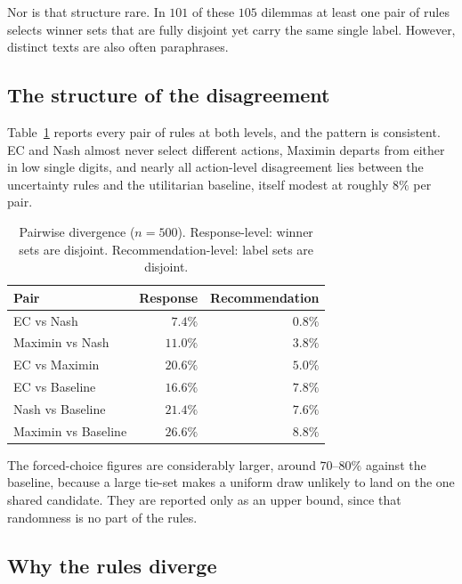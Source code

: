 \documentclass[10pt,twocolumn,a4paper]{article}
\begin{document}
Nor is that structure rare. In $101$ of these $105$ dilemmas at least
one pair of rules selects winner sets that are fully disjoint yet carry
the same single label. However, distinct texts are also often paraphrases.

\subsection{The structure of the disagreement}
\label{sec:results-pairwise}



Table~\ref{tab:pairwise} reports every pair of rules at both levels,
and the pattern is consistent. EC and Nash almost never select
different actions, Maximin departs from either in low single digits,
and nearly all action-level disagreement lies between the uncertainty
rules and the utilitarian baseline, itself modest at roughly $8\%$ per
pair.

\begin{table}[htbp]
\centering
\small
\caption{Pairwise divergence ($n = 500$). Response-level: winner sets
are disjoint. Recommendation-level: label sets are disjoint.}
\label{tab:pairwise}
\vspace{2pt}
\begin{tabular}{@{}l r r@{}}
\toprule
\textbf{Pair} & \textbf{Response} & \textbf{Recommendation} \\
\midrule
EC vs Nash            & $7.4\%$  & $0.8\%$ \\
Maximin vs Nash       & $11.0\%$ & $3.8\%$ \\
EC vs Maximin         & $20.6\%$ & $5.0\%$ \\
EC vs Baseline        & $16.6\%$ & $7.8\%$ \\
Nash vs Baseline      & $21.4\%$ & $7.6\%$ \\
Maximin vs Baseline   & $26.6\%$ & $8.8\%$ \\
\bottomrule
\end{tabular}
\end{table}

The forced-choice figures are considerably larger, around $70$--$80\%$
against the baseline, because a large tie-set makes a uniform draw
unlikely to land on the one shared candidate. They are reported only as
an upper bound, since that randomness is no part of the rules.

\subsection{Why the rules diverge}
\label{sec:results-why}
\end{document}
